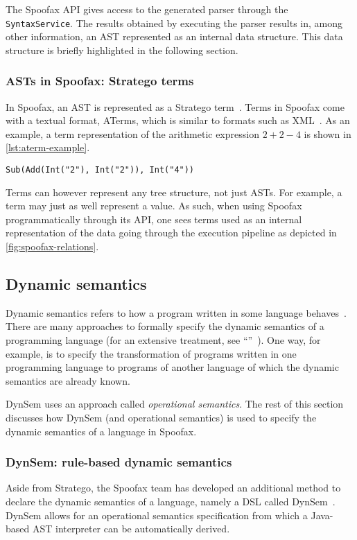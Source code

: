 The Spoofax API gives access to the generated parser through the
\texttt{SyntaxService}. The results obtained by executing the parser results in,
among other information, an AST represented as an internal data structure. This
data structure is briefly highlighted in the following section.

\subsubsection{ASTs in Spoofax: Stratego terms}
\label{sec:asts-spoof-strat}
In Spoofax, an AST is represented as a Stratego term~\cite{Kats10a}. Terms in
Spoofax come with a textual format, ATerms, which is similar to formats such as
XML~\cite{Brand00}. As an example, a term representation of the arithmetic
expression $2 + 2 - 4$ is shown in \cref{lst:aterm-example}.

\begin{lstlisting}[caption={An example ATerm representation of an arithmetic
expression.},language=aterm,label={lst:aterm-example}]
Sub(Add(Int("2"), Int("2")), Int("4"))
\end{lstlisting}

Terms can however represent any tree structure, not just ASTs. For example, a
term may just as well represent a value. As such, when using Spoofax
programmatically through its API, one sees terms used as an internal
representation of the data going through the execution pipeline as depicted in
\cref{fig:spoofax-relations}.

\subsection{Dynamic semantics}
\label{ssec:dynamic-semantics}
Dynamic semantics refers to how a program written in some language
behaves~\cite{Winskel93}. There are many approaches to formally specify the
dynamic semantics of a programming language (for an extensive treatment, see
``''~\cite{Winskel93}). One way, for example, is
to specify the transformation of programs written in one programming language to
programs of another language of which the dynamic semantics are already known.

DynSem uses an approach called \textit{operational semantics}. The rest of this
section discusses how DynSem (and operational semantics) is used to specify the
dynamic semantics of a language in Spoofax.

\subsubsection{DynSem: rule-based dynamic semantics}
\label{ssec:dynsem}
Aside from Stratego, the Spoofax team has developed an additional method to
declare the dynamic semantics of a language, namely a DSL called
DynSem~\cite{VerguNV15}. DynSem allows for an operational semantics
specification from which a Java-based AST interpreter can be automatically
derived.

